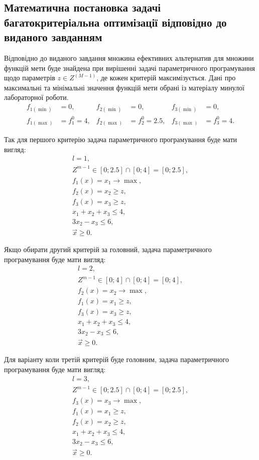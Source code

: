 \subsection{Математична постановка задачі багатокритеріальна оптимізації відповідно до виданого завданням}

Відповідно до виданого завдання множина ефективних альтернатив для множини функцій мети буде знайдена при вирішенні задачі параметричного програмування щодо параметрів $z \in Z^{(M-1)}$, де кожен критерій максимізується.
Дані про максимальні та мінімальні значення функцій мети обрані із матеріалу минулої лабораторної роботи.
\begin{align*}
    f_{1(\min)}&=0, &   f_{2(\min)}&=0, &   f_{3(\min)}&=0, \\
    f_{1(\max)}&=f_1^0=4,   &   f_{2(\max)}&=f_2^0=2.5, &   f_{3(\max)}&=f_3^0=4.
\end{align*} 

Так для першого критерію задача параметричного програмування буде мати вигляд:
\begin{gather*} 
    l = 1, \\
    Z^{m-1} \in [0; 2.5] \cap [0; 4] = [0; 2.5], \\
    f_1 (x) = x_1 \to \max, \\
    f_2 (x) = x_2 \geqslant z,  \\
    f_3 (x) = x_3 \geqslant z,  \\
    x_1 + x_2 + x_3 \leqslant 4, \\
    3 x_2 - x_3 \leqslant 6, \\
    \vec{x} \geqslant 0.
\end{gather*}

Якщо обирати другий критерій за головний, задача параметричного програмування буде мати вигляд:
\begin{gather*} 
    l = 2, \\
    Z^{m-1} \in [0; 4] \cap [0; 4] = [0; 4], \\
    f_2 (x) = x_2 \to \max, \\
    f_1 (x) = x_1 \geqslant z,  \\
    f_3 (x) = x_3 \geqslant z,  \\
    x_1 + x_2 + x_3 \leqslant 4, \\
    3 x_2 - x_3 \leqslant 6, \\
    \vec{x} \geqslant 0.
\end{gather*}

Для варіанту коли третій критерій буде головним, задача параметричного програмування буде мати вигляд:
\begin{gather*}
    l = 3, \\ 
    Z^{m-1} \in [0; 2.5] \cap [0; 4] = [0; 2.5], \\
    f_3 (x) = x_3 \to \max, \\
    f_1 (x) = x_1 \geqslant z,  \\
    f_2 (x) = x_2 \geqslant z,  \\
    x_1 + x_2 + x_3 \leqslant 4, \\
    3 x_2 - x_3 \leqslant 6, \\
    \vec{x} \geqslant 0.
\end{gather*}

